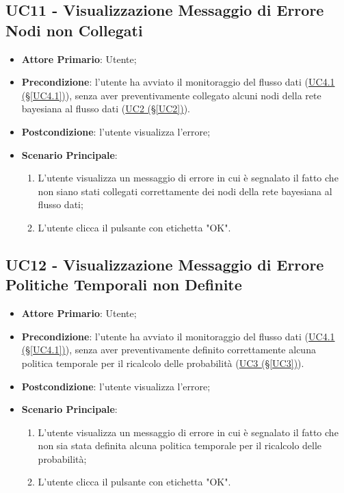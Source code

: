 \pagebreak

\subsection{UC11 - Visualizzazione Messaggio di Errore Nodi non Collegati}\label{UC11}
\begin{itemize}
\item \textbf{Attore Primario}: Utente;
\item \textbf{Precondizione}: l'utente ha avviato il monitoraggio del flusso dati (\hyperref[UC4.1]{UC4.1 							(§\ref*{UC4.1})}), senza aver preventivamente collegato alcuni nodi della rete bayesiana al flusso dati 							(\hyperref[UC2]{UC2 (§\ref*{UC2})}).
\item \textbf{Postcondizione}: l'utente visualizza l'errore;
\item \textbf{Scenario Principale}: 
	\begin{enumerate}
	\item L'utente visualizza un messaggio di errore in cui è segnalato il fatto che non siano stati collegati 						correttamente dei nodi della rete bayesiana al flusso dati;
	\item L'utente clicca il pulsante con etichetta "OK".
	\end{enumerate}
\end{itemize}

\pagebreak

\subsection{UC12 - Visualizzazione Messaggio di Errore Politiche Temporali non Definite}\label{UC12}
\begin{itemize}
\item \textbf{Attore Primario}: Utente;
\item \textbf{Precondizione}: l'utente ha avviato il monitoraggio del flusso dati (\hyperref[UC4.1]{UC4.1 							(§\ref*{UC4.1})}), senza aver preventivamente definito correttamente alcuna politica temporale per il ricalcolo delle probabilità (\hyperref[UC3]{UC3 (§\ref*{UC3})}).
\item \textbf{Postcondizione}: l'utente visualizza l'errore;
\item \textbf{Scenario Principale}: 
	\begin{enumerate}
	\item L'utente visualizza un messaggio di errore in cui è segnalato il fatto che non sia stata definita alcuna 				politica temporale per il ricalcolo delle probabilità;
	\item L'utente clicca il pulsante con etichetta "OK".
	\end{enumerate}
\end{itemize}

